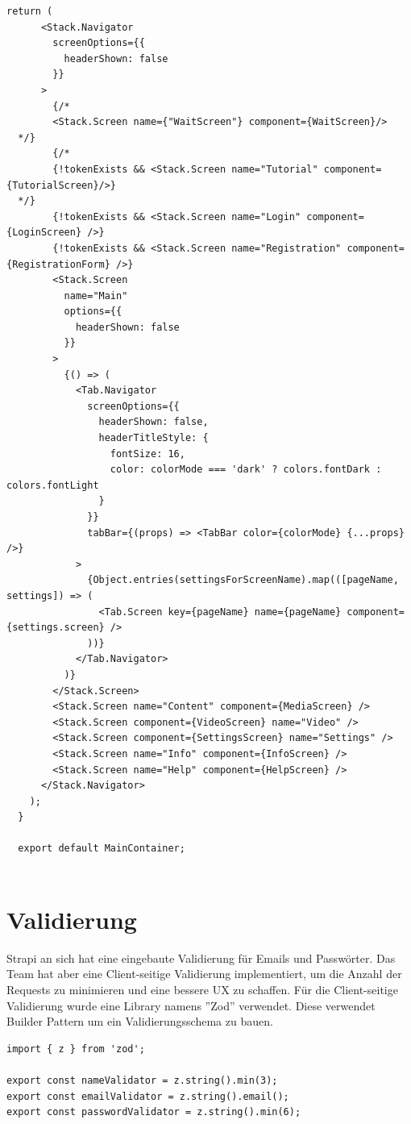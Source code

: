 \begin{lstlisting}[caption=protected screens]
    return (
      <Stack.Navigator
        screenOptions={{
          headerShown: false
        }}
      >
        {/*
        <Stack.Screen name={"WaitScreen"} component={WaitScreen}/>
  */}
        {/*
        {!tokenExists && <Stack.Screen name="Tutorial" component={TutorialScreen}/>}
  */}
        {!tokenExists && <Stack.Screen name="Login" component={LoginScreen} />}
        {!tokenExists && <Stack.Screen name="Registration" component={RegistrationForm} />}
        <Stack.Screen
          name="Main"
          options={{
            headerShown: false
          }}
        >
          {() => (
            <Tab.Navigator
              screenOptions={{
                headerShown: false,
                headerTitleStyle: {
                  fontSize: 16,
                  color: colorMode === 'dark' ? colors.fontDark : colors.fontLight
                }
              }}
              tabBar={(props) => <TabBar color={colorMode} {...props} />}
            >
              {Object.entries(settingsForScreenName).map(([pageName, settings]) => (
                <Tab.Screen key={pageName} name={pageName} component={settings.screen} />
              ))}
            </Tab.Navigator>
          )}
        </Stack.Screen>
        <Stack.Screen name="Content" component={MediaScreen} />
        <Stack.Screen component={VideoScreen} name="Video" />
        <Stack.Screen component={SettingsScreen} name="Settings" />
        <Stack.Screen name="Info" component={InfoScreen} />
        <Stack.Screen name="Help" component={HelpScreen} />
      </Stack.Navigator>
    );
  }
  
  export default MainContainer;
    
\end{lstlisting}

\section{Validierung}
Strapi an sich hat eine eingebaute Validierung für Emails und Passwörter. Das Team hat aber eine Client-seitige Validierung implementiert, um die Anzahl der Requests zu minimieren und eine bessere UX zu schaffen.
Für die Client-seitige Validierung wurde eine Library namens ''Zod'' verwendet. Diese verwendet Builder Pattern um ein Validierungsschema zu bauen.
\begin{lstlisting}[caption=Validierungsschemen]
 import { z } from 'zod';

export const nameValidator = z.string().min(3);
export const emailValidator = z.string().email();
export const passwordValidator = z.string().min(6);
  
\end{lstlisting}


